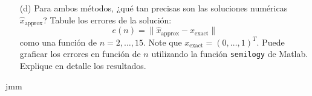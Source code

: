 \begin{enumerate}
    \item[(d)] Para ambos métodos, ¿qué tan precisas son las soluciones numéricas $\hat{x}_{\text{approx}}$? Tabule los errores de la solución:
    \[
    e(n) = \|\hat{x}_{\text{approx}} - x_{\text{exact}}\|
    \]
    como una función de $n = 2, \ldots, 15$. Note que $x_{\text{exact}} = (0, \ldots, 1)^T$. Puede graficar los errores en función de $n$ utilizando la función \texttt{semilogy} de Matlab. Explique en detalle los resultados.
\end{enumerate}

jmm